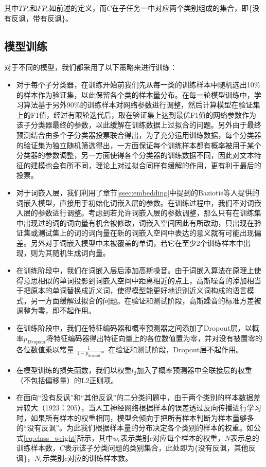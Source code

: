 其中$TP_c$和$FP_c$如前述的定义，而$C$在子任务一中对应两个类别组成的集合，即\{没有反讽，带有反讽\}。

\subsection{模型训练}
\label{ssec:exp_irony_det_model_training}

对于不同的模型，我们都采用了以下策略来进行训练：

\begin{itemize}

\item 对于每个子分类器，在训练开始前我们先从每一类的训练样本中随机选出10\%的样本作为验证集，以此保留各个类的样本量分布。在每一轮模型训练中，学习算法基于另外90\%的训练样本对网络参数进行调整，然后计算模型在验证集上的F1值，经过有限轮迭代后，取在验证集上达到最优F1值的网络参数作为该子分类器最终的参数，以此缓解在训练数据上过拟合的问题。另外由于最终预测结合由多个子分类器投票联合得出，为了充分运用训练数据，每个分类器的验证集为独立随机筛选得出，一方面保证每个训练样本都有概率被用于某个分类器的参数调整，另一方面使得各个分类器的训练数据不同，因此对文本特征的建模也会有所不同，理论上对过拟合同样有缓解的作用，更有利于最后的投票。

\item 对于词嵌入层，我们利用了章节\ref{ssec:embedding}中提到的Baziotis等人\cite{baziotis2018ntua}提供的词嵌入模型，直接用于初始化词嵌入层的参数。在训练过程中，我们不对词嵌入层的参数进行调整。考虑到若允许词嵌入层的参数调整，那么只有在训练集中出现过的词的词向量有机会被修改，词嵌入空间因此有所改动，只出现在验证集或测试集上的词的词向量在新的词嵌入空间中表达的意义就有可能出现偏差。另外对于词嵌入模型中未被覆盖的单词，若它在至少2个训练样本中出现，则为其随机生成词向量。

\item 在训练阶段中，我们在词嵌入层后添加高斯噪音。由于词嵌入算法在原理上使得意思相似的单词投影到词嵌入空间中距离相近的点上，高斯噪音的添加相当于把原本的单词替换成近义词，使得模型能更好地识别近义词构成的语言模式，另一方面缓解过拟合的问题。在验证和测试阶段，高斯躁音的标准方差被调整为零，即不起作用。

\item 在训练阶段中，我们在特征编码器和概率预测器之间添加了Dropout层，以概率$p_{Dropout}$将特征编码器得出特征向量上的各位数值置为零，并对没有被置零的各位数值乘以常量 $\frac{1}{1-p_{dropout}}$。在验证和测试阶段，Dropout层不起作用。

\item 在模型训练的损失函数，我们以权重$l_2$加入了概率预测器中全联接层的权重（不包括偏移量）的L2正则项。

\item 在面向“没有反讽”和“其他反讽”的二分类问题中，由于两个类别的样本数据差异较大（1923：205），当人工神经网络根据样本的误差透过反向传播进行学习时，如果所有样本的权重相同，模型会倾向于把所有样本判断为样本量够多的“没有反讽”。为此我们根据样本量的分布决定各个类别的样本的权重。如公式\ref{eq:class_weight}所示，其中$w_c$表示类别$c$对应每个样本的权重，$N$表示总的训练样本数，$C$表示该子分类问题的类别集合，此处即为\{没有反讽，其他反讽\}，$N_c$示类别$c$对应的训练样本数。

\end{itemize}

